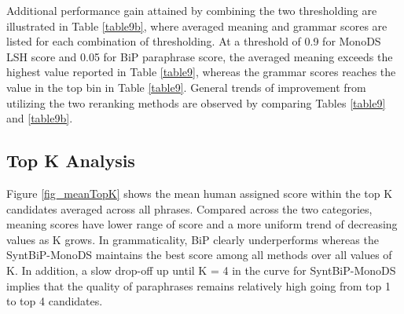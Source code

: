 \documentclass[11pt]{article}
\newcommand{\mnote}[1]{\marginpar{\raggedleft\footnotesize\itshape#1}}
\begin{document}
Additional performance gain attained by combining the two thresholding are illustrated in Table \ref{table9b}, where averaged meaning and grammar scores are listed for each combination of thresholding. At a threshold of 0.9 for MonoDS LSH score and 0.05 for BiP paraphrase score, the averaged meaning exceeds the highest value reported in Table \ref{table9}, whereas the grammar scores reaches the value in the top bin in Table \ref{table9}. General trends of improvement from utilizing the two reranking methods are observed by comparing Tables \ref{table9} and \ref{table9b}.

\vspace{-.1cm}
\subsection{Top K Analysis} %

Figure \ref{fig_meanTopK} shows the mean human assigned score within the top K candidates averaged across all phrases. 
Compared across the two categories, meaning scores have lower range of score and a more uniform trend of decreasing values as K grows.  In grammaticality, BiP clearly underperforms whereas the SyntBiP-MonoDS maintains the best score among all methods over all values of K. In addition, a slow drop-off up until K = 4 in the curve for SyntBiP-MonoDS implies that the quality of paraphrases remains relatively high going from top 1 to top 4 candidates.

\end{document}
